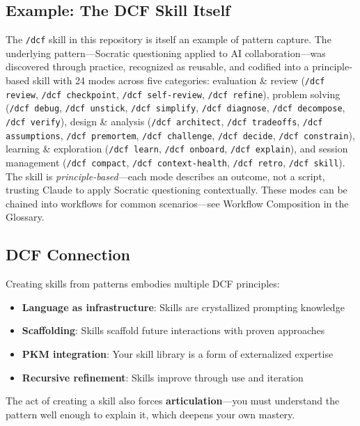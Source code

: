 \subsection{Example: The DCF Skill Itself}

The \texttt{/dcf} skill in this repository is itself an example of pattern capture. The underlying pattern---Socratic questioning applied to AI collaboration---was discovered through practice, recognized as reusable, and codified into a principle-based skill with 24 modes across five categories: evaluation \& review (\texttt{/dcf review}, \texttt{/dcf checkpoint}, \texttt{/dcf self-review}, \texttt{/dcf refine}), problem solving (\texttt{/dcf debug}, \texttt{/dcf unstick}, \texttt{/dcf simplify}, \texttt{/dcf diagnose}, \texttt{/dcf decompose}, \texttt{/dcf verify}), design \& analysis (\texttt{/dcf architect}, \texttt{/dcf tradeoffs}, \texttt{/dcf assumptions}, \texttt{/dcf premortem}, \texttt{/dcf challenge}, \texttt{/dcf decide}, \texttt{/dcf constrain}), learning \& exploration (\texttt{/dcf learn}, \texttt{/dcf onboard}, \texttt{/dcf explain}), and session management (\texttt{/dcf compact}, \texttt{/dcf context-health}, \texttt{/dcf retro}, \texttt{/dcf skill}). The skill is \emph{principle-based}---each mode describes an outcome, not a script, trusting Claude to apply Socratic questioning contextually. These modes can be chained into workflows for common scenarios---see Workflow Composition in the Glossary.

\subsection{DCF Connection}

Creating skills from patterns embodies multiple DCF principles:
\begin{itemize}
    \item \textbf{Language as infrastructure}: Skills are crystallized prompting knowledge
    \item \textbf{Scaffolding}: Skills scaffold future interactions with proven approaches
    \item \textbf{PKM integration}: Your skill library is a form of externalized expertise
    \item \textbf{Recursive refinement}: Skills improve through use and iteration
\end{itemize}

The act of creating a skill also forces \textbf{articulation}---you must understand the pattern well enough to explain it, which deepens your own mastery.

